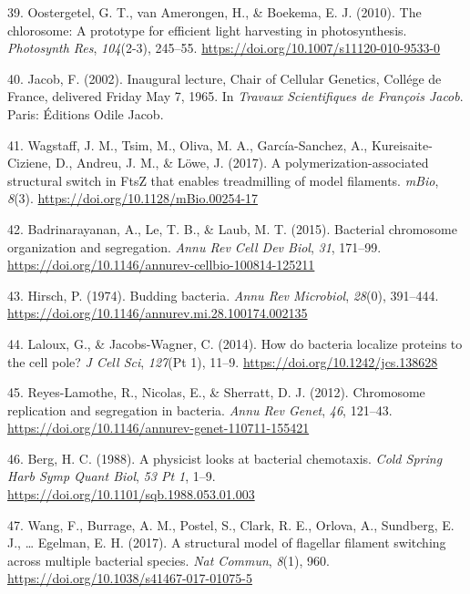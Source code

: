 \documentclass[]{tufte-book}
\begin{document}
\leavevmode\hypertarget{ref-oostergetel2010}{}%
39. Oostergetel, G. T., van Amerongen, H., \& Boekema, E. J. (2010). The chlorosome: A prototype for efficient light harvesting in photosynthesis. \emph{Photosynth Res}, \emph{104}(2-3), 245--55. \url{https://doi.org/10.1007/s11120-010-9533-0}

\leavevmode\hypertarget{ref-jacob2002a}{}%
40. Jacob, F. (2002). Inaugural lecture, Chair of Cellular Genetics, Collége de France, delivered Friday May 7, 1965. In \emph{Travaux Scientifiques de François Jacob}. Paris: Éditions Odile Jacob.

\leavevmode\hypertarget{ref-wagstaff2017}{}%
41. Wagstaff, J. M., Tsim, M., Oliva, M. A., García-Sanchez, A., Kureisaite-Ciziene, D., Andreu, J. M., \& Löwe, J. (2017). A polymerization-associated structural switch in FtsZ that enables treadmilling of model filaments. \emph{mBio}, \emph{8}(3). \url{https://doi.org/10.1128/mBio.00254-17}

\leavevmode\hypertarget{ref-badrinarayanan2015}{}%
42. Badrinarayanan, A., Le, T. B., \& Laub, M. T. (2015). Bacterial chromosome organization and segregation. \emph{Annu Rev Cell Dev Biol}, \emph{31}, 171--99. \url{https://doi.org/10.1146/annurev-cellbio-100814-125211}

\leavevmode\hypertarget{ref-hirsch1974}{}%
43. Hirsch, P. (1974). Budding bacteria. \emph{Annu Rev Microbiol}, \emph{28}(0), 391--444. \url{https://doi.org/10.1146/annurev.mi.28.100174.002135}

\leavevmode\hypertarget{ref-laloux2014}{}%
44. Laloux, G., \& Jacobs-Wagner, C. (2014). How do bacteria localize proteins to the cell pole? \emph{J Cell Sci}, \emph{127}(Pt 1), 11--9. \url{https://doi.org/10.1242/jcs.138628}

\leavevmode\hypertarget{ref-reyes-lamothe2012}{}%
45. Reyes-Lamothe, R., Nicolas, E., \& Sherratt, D. J. (2012). Chromosome replication and segregation in bacteria. \emph{Annu Rev Genet}, \emph{46}, 121--43. \url{https://doi.org/10.1146/annurev-genet-110711-155421}

\leavevmode\hypertarget{ref-berg1988}{}%
46. Berg, H. C. (1988). A physicist looks at bacterial chemotaxis. \emph{Cold Spring Harb Symp Quant Biol}, \emph{53 Pt 1}, 1--9. \url{https://doi.org/10.1101/sqb.1988.053.01.003}

\leavevmode\hypertarget{ref-wang2017}{}%
47. Wang, F., Burrage, A. M., Postel, S., Clark, R. E., Orlova, A., Sundberg, E. J., \ldots{} Egelman, E. H. (2017). A structural model of flagellar filament switching across multiple bacterial species. \emph{Nat Commun}, \emph{8}(1), 960. \url{https://doi.org/10.1038/s41467-017-01075-5}
\end{document}
